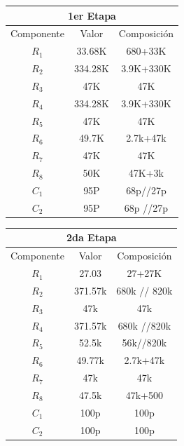 \begin{table}[H]
\centering
\begin{tabular}{ccc}
\multicolumn{3}{c}{1er Etapa}                                              \\ \hline
\multicolumn{1}{c|}{Componente} & \multicolumn{1}{c|}{Valor} & Composición \\ \hline
$R_1$                           & 33.68K                     & 680+33K     \\
$R_2$                           & 334.28K                    & 3.9K+330K   \\
$R_3$                           & 47K                        & 47K         \\
$R_4$                           & 334.28K                    & 3.9K+330K   \\
$R_5$                           & 47K                        & 47K         \\
$R_6$                           & 49.7K                        & 2.7k+47k         \\
$R_7$                           & 47K                        & 47K         \\
$R_8$                           & 50K                        & 47K+3k         \\
$C_1$                           & 95P                        & 68p//27p     \\
$C_2$                           & 95P                        & 68p //27p    
\end{tabular}
\end{table}
\begin{table}[H]
\centering
\begin{tabular}{ccc}
\multicolumn{3}{c}{2da Etapa}                                               \\ \hline
\multicolumn{1}{c|}{Componente} & \multicolumn{1}{c|}{Valor} & Composición  \\ \hline
$R_1$                           & 27.03                      & 27+27K      \\
$R_2$                           & 371.57k                    & 680k // 820k \\
$R_3$                           & 47k                        & 47k          \\
$R_4$                           & 371.57k                    & 680k //820k   \\
$R_5$                           & 52.5k                      & 56k//820k    \\
$R_6$                           & 49.77k                     & 2.7k+47k     \\
$R_7$                           & 47k                        & 47k          \\
$R_8$                           & 47.5k                        & 47k+500          \\
$C_1$                           & 100p                       & 100p         \\
$C_2$                           & 100p                       & 100p        
\end{tabular}
\end{table}
